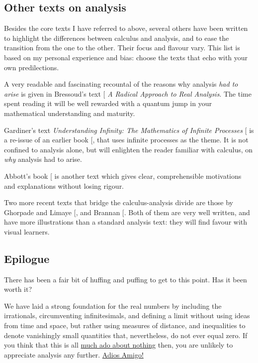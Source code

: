 \documentclass[
  a4paper,
]{article}
\begin{document}
\subsection{Other texts on analysis}\label{other-texts-on-analysis}

Besides the core texts I have referred to above, several others have
been written to highlight the differences between calculus and analysis,
and to ease the transition from the one to the other. Their focus and
flavour vary. This list is based on my personal experience and bias:
choose the texts that echo with your own predilections.

A very readable and fascinating recountal of the reasons why analysis
\emph{had to arise} is given in Bressoud's text
{[}\citeproc{ref-bressoud2007}{11}{]} \emph{A Radical Approach to Real
Analysis}. The time spent reading it will be well rewarded with a
quantum jump in your mathematical understanding and maturity.

Gardiner's text \emph{Understanding Infinity: The Mathematics of
Infinite Processes} {[}\citeproc{ref-gardiner2002}{12}{]} is a re-issue
of an earlier book {[}\citeproc{ref-gardiner1982}{13}{]}, that uses
infinite processes as the theme. It is not confined to analysis alone,
but will enlighten the reader familiar with calculus, on \emph{why}
analysis had to arise.

Abbott's book {[}\citeproc{ref-abbott2001}{14}{]} is another text which
gives clear, comprehensible motivations and explanations without losing
rigour.

Two more recent texts that bridge the calculus-analysis divide are those
by Ghorpade and Limaye {[}\citeproc{ref-ghorpadelimaye2006}{15}{]}, and
Brannan {[}\citeproc{ref-brannan2006}{16}{]}. Both of them are very well
written, and have more illustrations than a standard analysis text: they
will find favour with visual learners.

\subsection{Epilogue}\label{epilogue}

There has been a fair bit of huffing and puffing to get to this point.
Has it been worth it?

We have laid a strong foundation for the real numbers by including the
irrationals, circumventing infinitesimals, and defining a limit without
using ideas from time and space, but rather using measures of distance,
and inequalities to denote vanishingly small quantities that,
nevertheless, do not ever equal zero. If you think that this is all
\href{https://www.powerthesaurus.org/much_ado_about_nothing/synonyms}{much
ado about nothing} then, you are unlikely to appreciate analysis any
further.
\href{https://www.spanishdict.com/translate/adios\%20amigo}{Adios
Amigo!}
\end{document}
